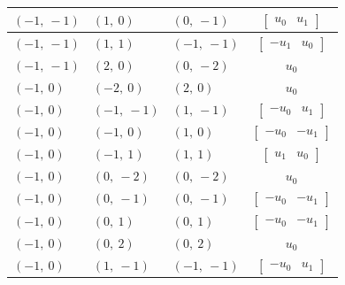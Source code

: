 \documentclass[11pt]{article}
\theoremstyle{definition}
\begin{document}
\begin{longtable}{|l|l|l|c|}
    \hline
    $\left( -1, \  -1\right)$ & $\left( 1, \  0\right)$ & $\left( 0, \  -1\right)$ & $\left[\begin{matrix}u_{0} & u_{1}\end{matrix}\right]$ \\
    \hline
    $\left( -1, \  -1\right)$ & $\left( 1, \  1\right)$ & $\left( -1, \  -1\right)$ & $\left[\begin{matrix}- u_{1} & u_{0}\end{matrix}\right]$ \\
    \hline
    $\left( -1, \  -1\right)$ & $\left( 2, \  0\right)$ & $\left( 0, \  -2\right)$ & $u_{0}$ \\
    \hline
    $\left( -1, \  0\right)$ & $\left( -2, \  0\right)$ & $\left( 2, \  0\right)$ & $u_{0}$ \\
    \hline
    $\left( -1, \  0\right)$ & $\left( -1, \  -1\right)$ & $\left( 1, \  -1\right)$ & $\left[\begin{matrix}- u_{0} & u_{1}\end{matrix}\right]$ \\
    \hline
    $\left( -1, \  0\right)$ & $\left( -1, \  0\right)$ & $\left( 1, \  0\right)$ & $\left[\begin{matrix}- u_{0} & - u_{1}\end{matrix}\right]$ \\
    \hline
    $\left( -1, \  0\right)$ & $\left( -1, \  1\right)$ & $\left( 1, \  1\right)$ & $\left[\begin{matrix}u_{1} & u_{0}\end{matrix}\right]$ \\
    \hline
    $\left( -1, \  0\right)$ & $\left( 0, \  -2\right)$ & $\left( 0, \  -2\right)$ & $u_{0}$ \\
    \hline
    $\left( -1, \  0\right)$ & $\left( 0, \  -1\right)$ & $\left( 0, \  -1\right)$ & $\left[\begin{matrix}- u_{0} & - u_{1}\end{matrix}\right]$ \\
    \hline
    $\left( -1, \  0\right)$ & $\left( 0, \  1\right)$ & $\left( 0, \  1\right)$ & $\left[\begin{matrix}- u_{0} & - u_{1}\end{matrix}\right]$ \\
    \hline
    $\left( -1, \  0\right)$ & $\left( 0, \  2\right)$ & $\left( 0, \  2\right)$ & $u_{0}$ \\
    \hline
    $\left( -1, \  0\right)$ & $\left( 1, \  -1\right)$ & $\left( -1, \  -1\right)$ & $\left[\begin{matrix}- u_{0} & u_{1}\end{matrix}\right]$ \\

\end{longtable}
\end{document}
